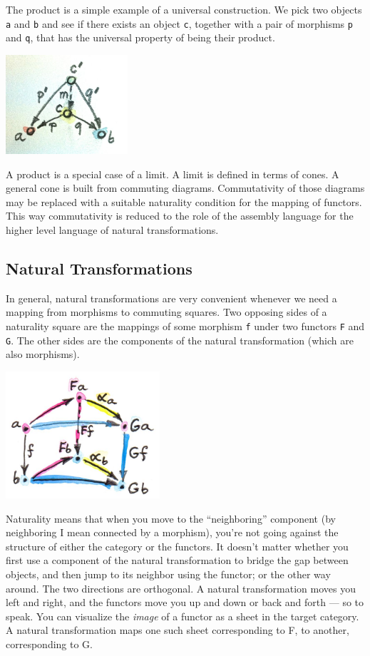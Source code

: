 The product is a simple example of a universal construction. We pick two
objects \texttt{a} and \texttt{b} and see if there exists an object
\texttt{c}, together with a pair of morphisms \texttt{p} and \texttt{q},
that has the universal property of being their product.

\includegraphics[width=1.78125in]{images/productranking.jpg}

A product is a special case of a limit. A limit is defined in terms of
cones. A general cone is built from commuting diagrams. Commutativity of
those diagrams may be replaced with a suitable naturality condition for
the mapping of functors. This way commutativity is reduced to the role
of the assembly language for the higher level language of natural
transformations.

\subsection{Natural Transformations}\label{natural-transformations}

In general, natural transformations are very convenient whenever we need
a mapping from morphisms to commuting squares. Two opposing sides of a
naturality square are the mappings of some morphism \texttt{f} under two
functors \texttt{F} and \texttt{G}. The other sides are the components
of the natural transformation (which are also morphisms).

\includegraphics[width=2.25000in]{images/3_naturality.jpg}

Naturality means that when you move to the ``neighboring'' component (by
neighboring I mean connected by a morphism), you're not going against
the structure of either the category or the functors. It doesn't matter
whether you first use a component of the natural transformation to
bridge the gap between objects, and then jump to its neighbor using the
functor; or the other way around. The two directions are orthogonal. A
natural transformation moves you left and right, and the functors move
you up and down or back and forth --- so to speak. You can visualize the
\emph{image} of a functor as a sheet in the target category. A natural
transformation maps one such sheet corresponding to F, to another,
corresponding to G.

